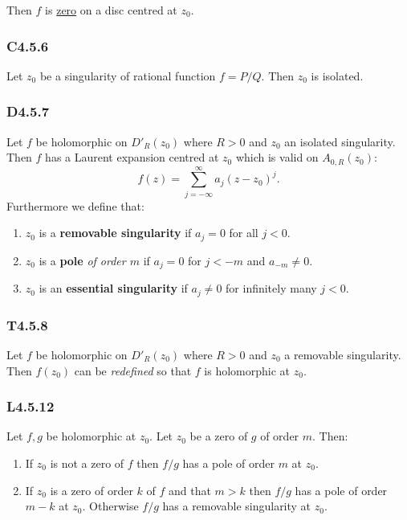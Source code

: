 \documentclass{article}
\begin{document}
\begin{multicols*}{3}
Then $f$ is \underline{zero} on a disc centred at $z_0$.

\subsubsection*{C4.5.6}
Let $z_0$ be a singularity of rational function $f=P/Q$.
Then $z_0$ is isolated.

\subsubsection*{D4.5.7}
Let $f$ be holomorphic on $D'_R(z_0)$ where $R>0$
and $z_0$ an isolated singularity. Then $f$ has a Laurent
expansion centred at $z_0$ which is valid on $A_{0,R}(z_0)$:
$$f(z)=\sum_{j=-\infty}^{\infty}a_j(z-z_0)^j.$$
Furthermore we define that:
\begin{enumerate}
    \item $z_0$ is a \textbf{removable singularity} if
    $a_j=0$ for all $j<0$.

    \item $z_0$ is a \textbf{pole} \textit{of order $m$} if
    $a_j=0$ for $j<-m$ and $a_{-m}\neq0$.

    \item $z_0$ is an \textbf{essential singularity} if $a_j\neq0$
    for infinitely many $j<0$.
\end{enumerate}

\subsubsection*{T4.5.8}
Let $f$ be holomorphic on $D'_R(z_0)$ where $R>0$ and
$z_0$ a removable singularity. Then $f(z_0)$ can be \textit{redefined}
so that $f$ is holomorphic at $z_0$.

\subsubsection*{L4.5.12}
Let $f,g$ be holomorphic at $z_0$. Let $z_0$ be a zero of $g$ of
order $m$. Then:
\begin{enumerate}
    \item If $z_0$ is not a zero of $f$ then
    $f/g$ has a pole of order $m$ at $z_0$.

    \item If $z_0$ is a zero of order $k$ of $f$ and that $m>k$
    then $f/g$ has a pole of order $m-k$ at $z_0$.
    Otherwise $f/g$ has a removable singularity at $z_0$.
\end{enumerate}


\end{multicols*}
\end{document}
